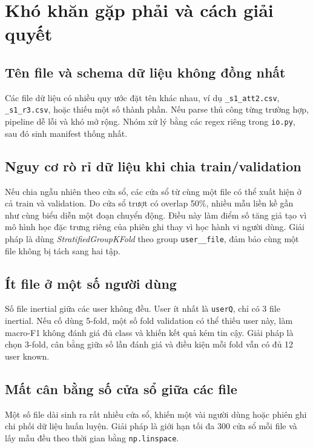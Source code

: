\documentclass[12pt,a4paper]{article}
\begin{document}
\section{Khó khăn gặp phải và cách giải quyết}

\subsection{Tên file và schema dữ liệu không đồng nhất}

Các file dữ liệu có nhiều quy ước đặt tên khác nhau, ví dụ \texttt{\_s1\_att2.csv}, \texttt{\_s1\_r3.csv}, hoặc thiếu một số thành phần. Nếu parse thủ công từng trường hợp, pipeline dễ lỗi và khó mở rộng. Nhóm xử lý bằng các regex riêng trong \texttt{io.py}, sau đó sinh manifest thống nhất.

\subsection{Nguy cơ rò rỉ dữ liệu khi chia train/validation}

Nếu chia ngẫu nhiên theo cửa sổ, các cửa sổ từ cùng một file có thể xuất hiện ở cả train và validation. Do cửa sổ trượt có overlap 50\%, nhiều mẫu liền kề gần như cùng biểu diễn một đoạn chuyển động. Điều này làm điểm số tăng giả tạo vì mô hình học đặc trưng riêng của phiên ghi thay vì học hành vi người dùng. Giải pháp là dùng \textit{StratifiedGroupKFold} theo group \texttt{user\_\_file}, đảm bảo cùng một file không bị tách sang hai tập.

\subsection{Ít file ở một số người dùng}

Số file inertial giữa các user không đều. User ít nhất là \texttt{userQ}, chỉ có 3 file inertial. Nếu cố dùng 5-fold, một số fold validation có thể thiếu user này, làm macro-F1 không đánh giá đủ class và khiến kết quả kém tin cậy. Giải pháp là chọn 3-fold, cân bằng giữa số lần đánh giá và điều kiện mỗi fold vẫn có đủ 12 user known.

\subsection{Mất cân bằng số cửa sổ giữa các file}

Một số file dài sinh ra rất nhiều cửa sổ, khiến một vài người dùng hoặc phiên ghi chi phối dữ liệu huấn luyện. Giải pháp là giới hạn tối đa 300 cửa sổ mỗi file và lấy mẫu đều theo thời gian bằng \texttt{np.linspace}.
\end{document}
